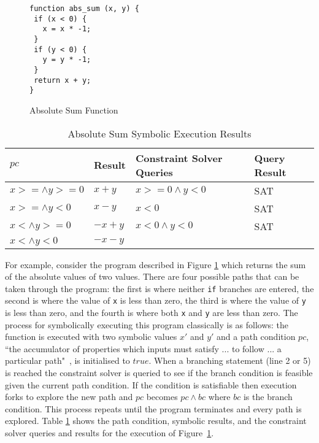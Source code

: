 \documentclass[]{final_report}
\begin{document}
\begin{figure}[t]
\begin{lstlisting}
function abs_sum (x, y) {
 if (x < 0) {
   x = x * -1;
 }
 if (y < 0) {
   y = y * -1;
 }
 return x + y;
}
\end{lstlisting}
\caption{\label{fig:abs-sum} Absolute Sum Function}
\end{figure} 

\begin{table}[t]
\centering
\begin{tabular}{|l|l|l|l|}
\hline
$pc$                & Result  & Constraint Solver Queries & Query Result \\ \hline
$x >= \land y >= 0$ & $x+y$   & $x >=0 \land y < 0 $      & SAT          \\ \hline
$x >= \land y < 0$  & $x - y$ & $x <0 $                   & SAT          \\ \hline
$x < \land y >= 0$  & $-x+y$  & $x<0 \land y < 0 $        & SAT          \\ \hline
$x < \land y < 0$   & $-x-y$  &                           &              \\ \hline
\end{tabular}
\caption{Absolute Sum Symbolic Execution Results}
\label{abs-sum-se-table}
\end{table}

For example, consider the program described in Figure \ref{fig:abs-sum} which returns the sum of the absolute values of two values. There are four possible paths that can be taken through the program: the first is where neither \lstinline|if| branches are entered, the second is where the value of \lstinline|x| is less than zero, the third is where the value of \lstinline|y| is less than zero, and the fourth is where both \lstinline|x| and \lstinline|y| are less than zero. The process for symbolically executing this program classically is as follows: the function is executed with two symbolic values $x'$ and $y'$ and a path condition $pc$, ``the accumulator of properties which inputs must satisfy ... to follow ... a particular path"~\cite{king1976symbolic}, is initialised to $true$. When a branching statement (line 2 or 5) is reached the constraint solver is queried to see if the branch condition is feasible given the current path condition. If the condition is satisfiable then execution forks to explore the new path and $pc$ becomes $pc \land bc$ where $bc$ is the branch condition. This process repeats until the program terminates and every path is explored. Table \ref{abs-sum-se-table} shows the path condition, symbolic results, and the constraint solver queries and results for the execution of Figure~\ref{fig:abs-sum}.
\end{document}
